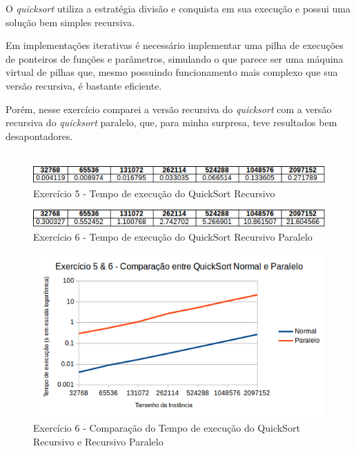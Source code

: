 \documentclass[a4paper, fontsize=12pt, parskip=half]{scrartcl}
\theoremstyle{mytheor}
\begin{document}
O \textit{quicksort} utiliza a estratégia divisão e conquista em sua execução e possui uma solução bem simples recursiva.

Em implementações iterativas é necessário implementar uma pilha de execuções de ponteiros de funções e parâmetros, simulando o que parece ser uma máquina virtual de pilhas que, mesmo possuindo funcionamento mais complexo que sua versão recursiva, é bastante eficiente. 

Porém, nesse exercício comparei a versão recursiva do \textit{quicksort} com a versão recursiva do \textit{quicksort} paralelo, que, para minha surpresa, teve resultados bem desapontadores.\\\\

\begin{figure}[htb!]
	\centering
	\includegraphics[width=1\linewidth]{gfx/5aQ}
	\caption{Exercício 5 - Tempo de execução do QuickSort Recursivo}
	\label{fig:5aq}
\end{figure}

\begin{figure}[htb!]
	\centering
	\includegraphics[width=1\linewidth]{gfx/6aQ}
	\caption{Exercício 6 - Tempo de execução do QuickSort Recursivo Paralelo}
	\label{fig:6aq}
\end{figure}

\begin{figure}[htb!]
	\centering
	\includegraphics[width=1\linewidth]{gfx/56aQ_g}
	\caption{Exercício 6 - Comparação do Tempo de execução do QuickSort Recursivo e Recursivo Paralelo}
	\label{fig:56aq}
\end{figure}
\end{document}
